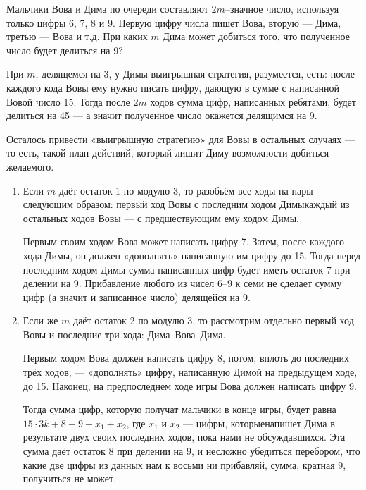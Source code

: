 \begin{itemize}

	\itC Мальчики Вова и Дима по очереди составляют $2m$--значное число, используя только цифры 6, 7, 8 и 9. Первую цифру числа пишет Вова, вторую — Дима, третью — Вова и т.д. При каких $m$ Дима может добиться того, что полученное число будет делиться на 9?
	
	\itr При $m$, делящемся на 3, у Димы выигрышная стратегия, разумеется, есть: после каждого кода Вовы ему нужно писать цифру, дающую в сумме с написанной Вовой число 15. Тогда после $2m$ ходов сумма цифр, написанных ребятами, будет делиться на 45 — а значит полученное число окажется делящимся на 9.
	
	Осталось привести «выигрышную стратегию» для Вовы в остальных случаях — то есть, такой план действий, который лишит Диму возможности добиться желаемого.
	
	\begin{enumerate}[label=\arabic*.]
	
	\item Если $m$ даёт остаток 1 по модулю 3, то разобьём все ходы на пары следующим образом: первый ход Вовы с последним ходом Димы\scolon каждый из остальных ходов Вовы — с предшествующим ему ходом Димы.
	
	Первым своим ходом Вова может написать цифру 7. Затем, после каждого хода Димы, он должен «дополнять» написанную им цифру до 15. Тогда перед последним ходом Димы сумма написанных цифр будет иметь остаток 7 при делении на 9. Прибавление любого из чисел 6–9 к семи не сделает сумму цифр (а значит и записанное число) делящейся на 9.
	
	\item Если же $m$ даёт остаток 2 по модулю 3, то рассмотрим отдельно первый ход Вовы и последние три хода: Дима–Вова–Дима.
	
	Первым ходом Вова должен написать цифру 8, потом, вплоть до последних трёх ходов, — «дополнять» цифру, написанную Димой на предыдущем ходе, до 15. Наконец, на предпоследнем ходе игры Вова должен написать цифру 9.
	
	Тогда сумма цифр, которую получат мальчики в конце игры, будет равна $15 \cdot 3k + 8 + 9 + x_1 + x_2$, где $x_1$ и $x_2$ — цифры, которые\linebreak напишет Дима в результате двух своих последних ходов, пока нами не обсуждавшихся. Эта сумма даёт остаток 8 при делении на 9, и несложно убедиться перебором, что какие две цифры из данных нам к восьми ни прибавляй, сумма, кратная 9, получиться не может. 
	
	\end{enumerate}

\end{itemize}

